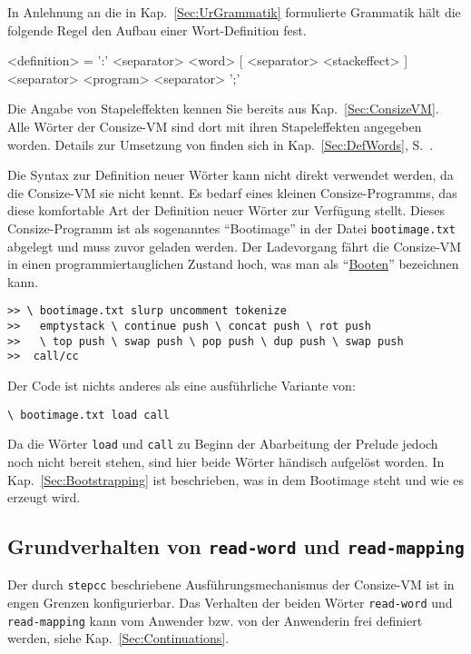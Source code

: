 In Anlehnung an die in Kap.~\ref{Sec:UrGrammatik} formulierte Grammatik hält die folgende Regel den Aufbau einer Wort-Definition fest.

\begin{grammar}
<definition> = ':' <separator> <word> [ <separator> <stackeffect> ] <separator> <program> <separator> ';'  
\end{grammar}

Die Angabe von Stapeleffekten kennen Sie bereits aus Kap.~\ref{Sec:ConsizeVM}. Alle Wörter der Consize-VM sind dort mit ihren Stapeleffekten angegeben worden. Details zur Umsetzung von  finden sich in Kap.~\ref{Sec:DefWords}, S.~\pageref{Sec:DefWords}.

Die Syntax zur Definition neuer Wörter kann nicht direkt verwendet werden, da die Consize-VM sie nicht kennt. Es bedarf eines kleinen Consize-Programms, das diese komfortable Art der Definition neuer Wörter zur Verfügung stellt. Dieses Consize-Programm ist als sogenanntes "`Bootimage"' in der Datei \verb|bootimage.txt| abgelegt und muss zuvor geladen werden. Der Ladevorgang fährt die Consize-VM in einen programmiertauglichen Zustand hoch, was man als "`\href{http://de.wikipedia.org/wiki/Booten}{Booten}"' bezeichnen kann.

\begin{verbatim}
>> \ bootimage.txt slurp uncomment tokenize
>>   emptystack \ continue push \ concat push \ rot push
>>   \ top push \ swap push \ pop push \ dup push \ swap push
>>  call/cc
\end{verbatim}

Der Code ist nichts anderes als eine ausführliche Variante von:

\begin{verbatim}
\ bootimage.txt load call
\end{verbatim}

Da die Wörter \verb|load| und \verb|call| zu Beginn der Abarbeitung der Prelude jedoch noch nicht bereit stehen, sind hier beide Wörter händisch aufgelöst worden. In Kap.~\ref{Sec:Bootstrapping} ist beschrieben, was in dem Bootimage steht und wie es erzeugt wird.

\subsection{Grundverhalten von \texttt{read-word} und \texttt{read-mapping}}

Der durch \verb|stepcc| beschriebene Ausführungsmechanismus der Consize-VM ist in engen Grenzen konfigurierbar. Das Verhalten der beiden Wörter \verb|read-word| und \verb|read-mapping| kann vom Anwender bzw. von der Anwenderin frei definiert werden, siehe Kap.~\ref{Sec:Continuations}.

